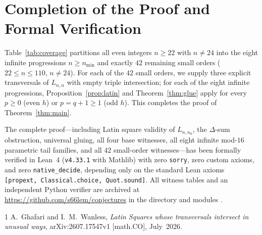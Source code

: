 \documentclass[11pt]{article}
\begin{document}
\section{Completion of the Proof and Formal Verification}

Table~\ref{tab:coverage} partitions all even integers $n \ge 22$ with $n \ne 24$ into the eight infinite progressions $n \ge n_{\min}$ and exactly $42$ remaining small orders ($22 \le n \le 110$, $n \ne 24$). For each of the $42$ small orders, we supply three explicit transversals of $L_{n, n}$ with empty triple intersection; for each of the eight infinite progressions, Proposition~\ref{prop:latin} and Theorem~\ref{thm:glue} apply for every $p \ge 0$ (even $h$) or $p = q + 1 \ge 1$ (odd $h$). This completes the proof of Theorem~\ref{thm:main}.

The complete proof---including Latin square validity of $L_{n, n_0}$, the $\Delta$-sum obstruction, universal gluing, all four base witnesses, all eight infinite mod-$16$ parametric tail families, and all $42$ small-order witnesses---has been formally verified in Lean~4 (\texttt{v4.33.1} with Mathlib) with zero \texttt{sorry}, zero custom axioms, and zero \texttt{native\_decide}, depending only on the standard Lean axioms \texttt{[propext, Classical.choice, Quot.sound]}. All witness tables and an independent Python verifier are archived at \url{https://github.com/s66lem/conjectures} in the directory  and modules .

\begin{thebibliography}{1}
A.~Ghafari and I.~M.~Wanless, \emph{Latin Squares whose transversals intersect in unusual ways}, arXiv:2607.17547v1 [math.CO], July~2026.
\end{thebibliography}
\end{document}
